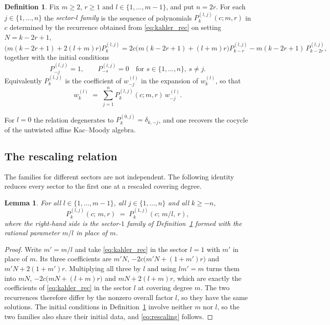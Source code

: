 \documentclass[11pt]{amsart}
\newtheorem{lemma}[theorem]{Lemma}
\theoremstyle{definition}
\newtheorem{definition}[theorem]{Definition}
\theoremstyle{remark}
\begin{document}
\begin{definition}\label{def:SNF_polys}
Fix $m\geq2$, $r\geq1$ and $l\in\{1,\ldots,m-1\}$, and put $n=2r$. For each
$j\in\{1,\ldots,n\}$ the \emph{sector-$l$ family} is the sequence of
polynomials $P^{(l,j)}_k(c;m,r)$ in $c$ determined by the recurrence obtained
from \eqref{eq:kahler_rec} on setting $N=k-2r+1$,
\begin{equation}\label{eq:SNF_rec}
  \bigl(m(k-2r+1)+2(l+m)r\bigr)P^{(l,j)}_{k}
  = 2c\bigl(m(k-2r+1)+(l+m)r\bigr)P^{(l,j)}_{k-r}
  - m(k-2r+1)\,P^{(l,j)}_{k-2r},
\end{equation}
together with the initial conditions
\[
  P^{(l,j)}_{-j}=1, \qquad P^{(l,j)}_{-s}=0 \quad\text{for } s\in\{1,\ldots,n\},\ s\neq j .
\]
Equivalently $P^{(l,j)}_k$ is the coefficient of $w^{(l)}_{-j}$ in the
expansion of $w^{(l)}_k$, so that
\[
  w^{(l)}_k \;=\; \sum_{j=1}^{n} P^{(l,j)}_k(c;m,r)\,w^{(l)}_{-j} .
\]
\end{definition}

For $l=0$ the relation degenerates to $P^{(0,j)}_k=\delta_{k,-j}$, and one
recovers the cocycle of the untwisted affine Kac--Moody algebra.

\subsection{The rescaling relation}

The families for different sectors are not independent. The following identity
reduces every sector to the first one at a rescaled covering degree.

\begin{lemma}\label{lem:rescaling}
For all $l\in\{1,\ldots,m-1\}$, all $j\in\{1,\ldots,n\}$ and all $k\geq-n$,
\begin{equation}\label{eq:rescaling}
  P^{(l,j)}_k(c;\,m,r) \;=\; P^{(1,j)}_k(c;\,m/l,\,r),
\end{equation}
where the right-hand side is the sector-$1$ family of
Definition~\ref{def:SNF_polys} formed with the rational parameter $m/l$ in
place of $m$.
\end{lemma}

\begin{proof}
Write $m'=m/l$ and take \eqref{eq:kahler_rec} in the sector $l=1$ with $m'$ in
place of $m$. Its three coefficients are $m'N$, $-2c\bigl(m'N+(1+m')r\bigr)$
and $m'N+2(1+m')r$. Multiplying all three by $l$ and using $lm'=m$ turns them
into $mN$, $-2c\bigl(mN+(l+m)r\bigr)$ and $mN+2(l+m)r$, which are exactly the
coefficients of \eqref{eq:kahler_rec} in the sector $l$ at covering degree $m$.
The two recurrences therefore differ by the nonzero overall factor $l$, so they
have the same solutions. The initial conditions in
Definition~\ref{def:SNF_polys} involve neither $m$ nor $l$, so the two families
also share their initial data, and \eqref{eq:rescaling} follows.
\end{proof}
\end{document}
